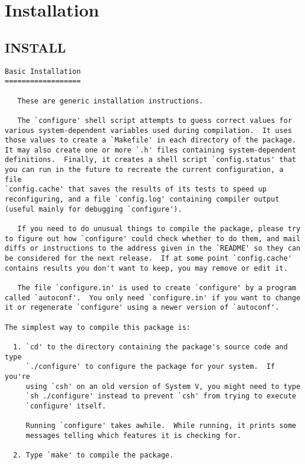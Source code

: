 \section{Installation}
\label{group__install}
\subsection{INSTALL}\label{install}


\footnotesize\begin{verbatim}Basic Installation
==================

   These are generic installation instructions.

   The `configure' shell script attempts to guess correct values for
various system-dependent variables used during compilation.  It uses
those values to create a `Makefile' in each directory of the package.
It may also create one or more `.h' files containing system-dependent
definitions.  Finally, it creates a shell script `config.status' that
you can run in the future to recreate the current configuration, a file
`config.cache' that saves the results of its tests to speed up
reconfiguring, and a file `config.log' containing compiler output
(useful mainly for debugging `configure').

   If you need to do unusual things to compile the package, please try
to figure out how `configure' could check whether to do them, and mail
diffs or instructions to the address given in the `README' so they can
be considered for the next release.  If at some point `config.cache'
contains results you don't want to keep, you may remove or edit it.

   The file `configure.in' is used to create `configure' by a program
called `autoconf'.  You only need `configure.in' if you want to change
it or regenerate `configure' using a newer version of `autoconf'.

The simplest way to compile this package is:

  1. `cd' to the directory containing the package's source code and type
     `./configure' to configure the package for your system.  If you're
     using `csh' on an old version of System V, you might need to type
     `sh ./configure' instead to prevent `csh' from trying to execute
     `configure' itself.

     Running `configure' takes awhile.  While running, it prints some
     messages telling which features it is checking for.

  2. Type `make' to compile the package.


\end{verbatim}
